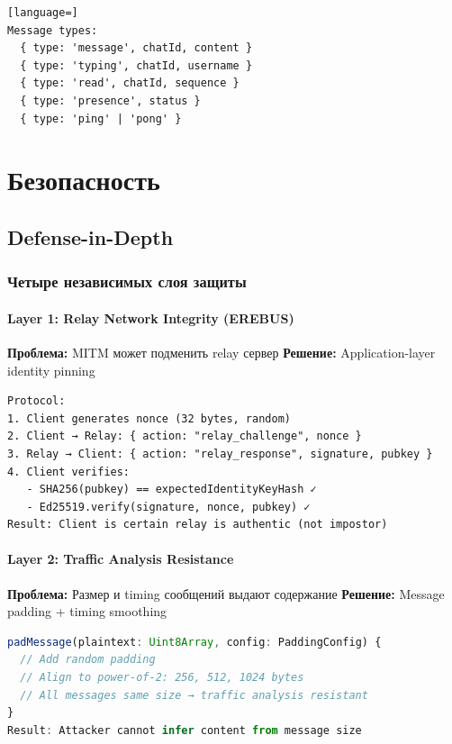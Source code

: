 \documentclass[11pt,a4paper,oneside]{book}
\begin{document}
\begin{lstlisting}[language=]
Message types:
  { type: 'message', chatId, content }
  { type: 'typing', chatId, username }
  { type: 'read', chatId, sequence }
  { type: 'presence', status }
  { type: 'ping' | 'pong' }
\end{lstlisting}
\vspace{-1cm}\part{Безопасность}
\vspace{-0.5cm}\chapter{Defense-in-Depth}
\vspace{-0.3cm}\section{Четыре независимых слоя защиты}
\vspace{-0.2cm}\subsection{Layer 1: Relay Network Integrity (EREBUS)}
\textbf{Проблема:} MITM может подменить relay сервер
\textbf{Решение:} Application-layer identity pinning
\begin{verbatim}
Protocol:
1. Client generates nonce (32 bytes, random)
2. Client → Relay: { action: "relay_challenge", nonce }
3. Relay → Client: { action: "relay_response", signature, pubkey }
4. Client verifies:
   - SHA256(pubkey) == expectedIdentityKeyHash ✓
   - Ed25519.verify(signature, nonce, pubkey) ✓
Result: Client is certain relay is authentic (not impostor)
\end{verbatim}
\vspace{-0.2cm}\subsection{Layer 2: Traffic Analysis Resistance}
\textbf{Проблема:} Размер и timing сообщений выдают содержание
\textbf{Решение:} Message padding + timing smoothing
\begin{lstlisting}[language=TypeScript]
padMessage(plaintext: Uint8Array, config: PaddingConfig) {
  // Add random padding
  // Align to power-of-2: 256, 512, 1024 bytes
  // All messages same size → traffic analysis resistant
}
Result: Attacker cannot infer content from message size
\end{lstlisting}
\end{document}
